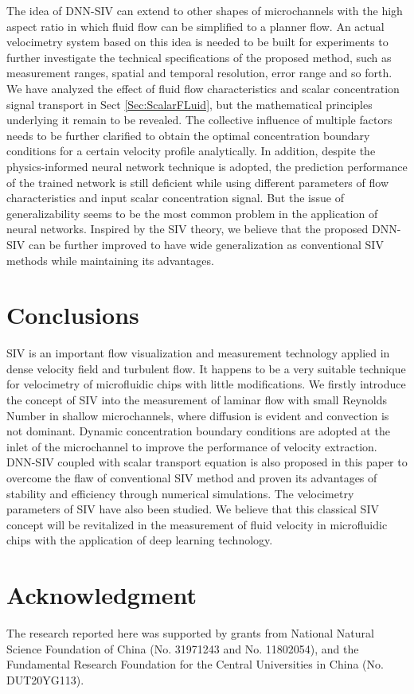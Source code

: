 \documentclass{article}
\begin{document}
The idea of DNN-SIV can extend to other shapes of microchannels with the high aspect ratio in which fluid flow can be simplified to a planner flow. An actual velocimetry system based on this idea is needed to be built for experiments to further investigate the technical specifications of the proposed method, such as measurement ranges, spatial and temporal resolution, error range and so forth. We have analyzed the effect of fluid flow characteristics and scalar concentration signal transport in Sect \ref{Sec:ScalarFLuid}, but the mathematical principles underlying it remain to be revealed. The collective influence of multiple factors needs to be further clarified to obtain the optimal concentration boundary conditions for a certain velocity profile analytically. In addition, despite the physics-informed neural network technique is adopted, the prediction performance of the trained network is still deficient while using different parameters of flow characteristics and input scalar concentration signal. But the issue of generalizability seems to be the most common problem in the application of neural networks. Inspired by the SIV theory, we believe that the proposed DNN-SIV can be further improved to have wide generalization as conventional SIV methods while maintaining its advantages.

\section{Conclusions}
SIV is an important flow visualization and measurement technology applied in dense velocity field and turbulent flow. It happens to be a very suitable technique for velocimetry of microfluidic chips with little modifications. We firstly introduce the concept of SIV into the measurement of laminar flow with small Reynolds Number in shallow microchannels, where diffusion is evident and convection is not dominant. Dynamic concentration boundary conditions are adopted at the inlet of the microchannel to improve the performance of velocity extraction. DNN-SIV coupled with scalar transport equation is also proposed in this paper to overcome the flaw of conventional SIV method and proven its advantages of stability and efficiency through numerical simulations. The velocimetry parameters of SIV have also been studied. We believe that this classical SIV concept will be revitalized in the measurement of fluid velocity in microfluidic chips with the application of deep learning technology.

\section*{Acknowledgment}
The research reported here was supported by grants from National Natural Science Foundation of China (No. 31971243 and No. 11802054), and the Fundamental Research Foundation for the Central Universities in China (No. DUT20YG113).



\end{document}
